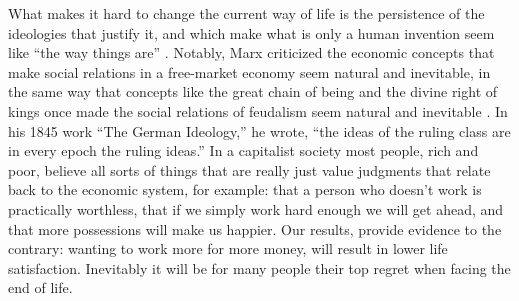 \documentclass[10pt, letterpaper]{article}
\newcommand{\emd}[1]{\ExecuteMetaData[/tmp/tex]{#1}} %
\begin{document}
\begin{spacing}{1.8}
What makes it hard to change the current way of life is the persistence
of the ideologies that justify it, and which make what is only a human
invention seem like ``the way things are'' \citep{menandMISC16oct3}.  %
Notably, Marx %
criticized the economic concepts that make social
relations in a free-market economy seem natural and inevitable, in the same way
that concepts like the great chain of being and the divine right of kings once
made the social relations of feudalism seem natural and inevitable \citep{menandMISC16oct3}. 
%
In his 1845 work ``The German Ideology,'' he wrote, ``the ideas of the ruling class are in every epoch the ruling ideas.''
In a capitalist society most people, rich and poor, believe all sorts of things
that are really just value judgments that relate back to the economic system,
for example: that a person who doesn't work is practically worthless, that if we
simply work hard enough we will get ahead, and that more possessions will make us
happier. Our results, provide evidence to the contrary: wanting to work more for more
money, will result in lower life satisfaction. Inevitably it will be for many people their top regret when facing the end of life. 










\end{spacing}
\end{document}
